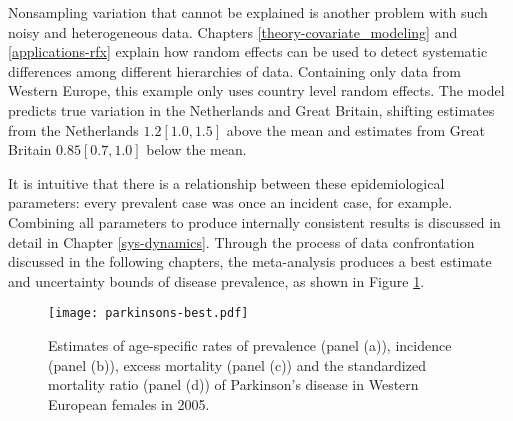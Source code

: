 Nonsampling variation that cannot be explained is another problem with
such noisy and heterogeneous data.  Chapters
\ref{theory-covariate_modeling} and \ref{applications-rfx} explain how
random effects can be used to detect systematic differences among
different hierarchies of data.  Containing only data from Western Europe,
this example only uses country level random effects.  The model predicts
true variation in the Netherlands and Great Britain, shifting estimates
from the Netherlands $1.2 [1.0, 1.5]$ above the mean and estimates
from Great Britain $0.85 [0.7, 1.0]$ below the mean.

It is intuitive that there is a relationship between these
epidemiological parameters: every prevalent case was once an incident
case, for example.  Combining all parameters to produce internally
consistent results is discussed in detail in Chapter
\ref{sys-dynamics}.  Through the process of data confrontation
discussed in the following chapters, the meta-analysis produces a best
estimate and uncertainty bounds of disease prevalence, as shown in
Figure \ref{fig:intro-parkinsons fit}.

    \begin{figure}[h]
        \begin{center}
            \texttt{[image: parkinsons-best.pdf]}
            \caption{Estimates of age-specific rates of
              prevalence (panel (a)), incidence (panel (b)),
              excess mortality (panel (c)) and the
              standardized mortality ratio (panel (d)) of Parkinson's
              disease in Western European females in 2005.}
            \label{fig:intro-parkinsons fit}
        \end{center}
    \end{figure}
